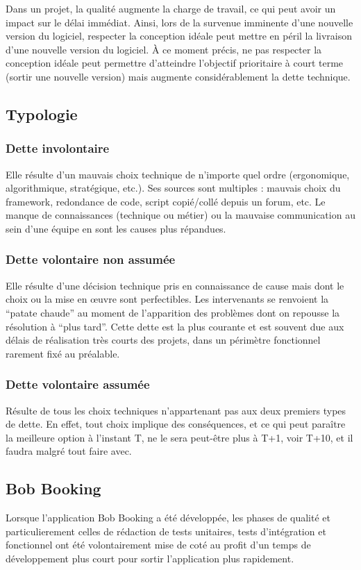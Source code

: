 Dans un projet, la qualité augmente la charge de travail, ce qui peut avoir un impact sur le délai immédiat. Ainsi, lors de la survenue imminente d'une nouvelle version du logiciel, respecter la conception idéale peut mettre en péril la livraison d'une nouvelle version du logiciel. 
À ce moment précis, ne pas respecter la conception idéale peut permettre d'atteindre l'objectif prioritaire à court terme (sortir une nouvelle version) mais augmente considérablement la dette technique. 

\subsection{Typologie}

\subsubsection{Dette involontaire}
Elle résulte d’un mauvais choix technique de n’importe quel ordre (ergonomique, algorithmique, stratégique, etc.). Ses sources sont multiples : mauvais choix du framework, redondance de code, script copié/collé depuis un forum, etc. Le manque de connaissances (technique ou métier) ou la mauvaise communication au sein d’une équipe en sont les causes plus répandues.

\subsubsection{Dette volontaire non assumée}
Elle résulte d’une décision technique pris en connaissance de cause mais dont le choix ou la mise en œuvre sont perfectibles. Les intervenants se renvoient la “patate chaude” au moment de l’apparition des problèmes dont on repousse la résolution à “plus tard”. Cette dette est la plus courante et est souvent due aux délais de réalisation très courts des projets, dans un périmètre fonctionnel rarement fixé au préalable.

\subsubsection{Dette volontaire assumée}
Résulte de tous les choix techniques n’appartenant pas aux deux premiers types de dette. En effet, tout choix implique des conséquences, et ce qui peut paraître la meilleure option à l’instant T, ne le sera peut-être plus à T+1, voir T+10, et il faudra malgré tout faire avec.
\jumpOne

\subsection{Bob Booking}
Lorsque l'application Bob Booking a été développée, les phases de qualité et particulierement celles de rédaction de tests unitaires, tests d'intégration et fonctionnel ont été volontairement mise de coté au profit d'un temps de développement plus court pour sortir l'application plus rapidement. 

